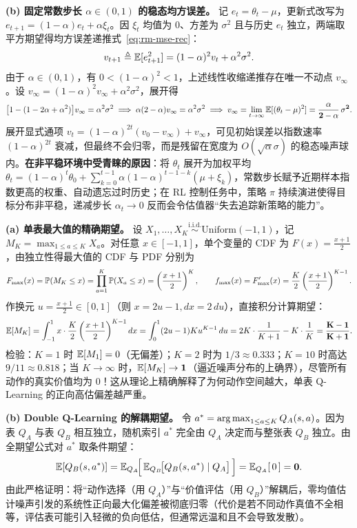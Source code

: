 \textbf{(b) 固定常数步长 $\alpha \in (0, 1)$ 的稳态均方误差。} 记 $e_t = \theta_t - \mu$，更新式改写为 $e_{t+1} = (1 - \alpha) e_t + \alpha \xi_t$。因 $\xi_t$ 均值为 $0$、方差为 $\sigma^2$ 且与历史 $e_t$ 独立，两端取平方期望得均方误差递推式~\eqref{eq:rm-mse-rec}：
\[
  v_{t+1} \triangleq \mathbb{E}[e_{t+1}^2] = (1 - \alpha)^2 v_t + \alpha^2 \sigma^2.
\]
由于 $\alpha \in (0, 1)$，有 $0 < (1 - \alpha)^2 < 1$，上述线性收缩递推存在唯一不动点 $v_\infty$。设 $v_\infty = (1 - \alpha)^2 v_\infty + \alpha^2 \sigma^2$，展开得
\[
  \big[1 - (1 - 2\alpha + \alpha^2)\big] v_\infty = \alpha^2 \sigma^2 \implies \alpha(2 - \alpha) v_\infty = \alpha^2 \sigma^2 \implies
  v_\infty = \lim_{t \to \infty} \mathbb{E}[(\theta_t - \mu)^2] = \mathbf{\frac{\alpha}{2 - \alpha}\,\sigma^2}.
\]
展开显式通项 $v_t = (1 - \alpha)^{2t}(v_0 - v_\infty) + v_\infty$，可见初始误差以指数速率 $(1-\alpha)^{2t}$ 衰减，但最终不会归零，而是残留在宽度为 $O(\sqrt{\alpha}\sigma)$ 的稳态噪声球内。\textbf{在非平稳环境中受青睐的原因}：将 $\theta_t$ 展开为加权平均 $\theta_t = (1-\alpha)^t \theta_0 + \sum_{k=0}^{t-1} \alpha(1-\alpha)^{t-1-k}(\mu + \xi_k)$，常数步长赋予近期样本指数更高的权重、自动遗忘过时历史；在 RL 控制任务中，策略 $\pi$ 持续演进使得目标分布非平稳，递减步长 $\alpha_t \to 0$ 反而会令估值器“失去追踪新策略的能力”。


\textbf{(a) 单表最大值的精确期望。} 设 $X_1, \dots, X_K \overset{\mathrm{i.i.d.}}{\sim} \mathrm{Uniform}(-1, 1)$，记 $M_K = \max_{1 \le a \le K} X_a$。对任意 $x \in [-1, 1]$，单个变量的 CDF 为 $F(x) = \frac{x + 1}{2}$，由独立性得最大值的 CDF 与 PDF 分别为
\[
  F_{\max}(x) = \mathbb{P}(M_K \le x) = \prod_{a=1}^K \mathbb{P}(X_a \le x) = \left(\frac{x + 1}{2}\right)^K, \qquad
  f_{\max}(x) = F'_{\max}(x) = \frac{K}{2}\left(\frac{x + 1}{2}\right)^{K-1}.
\]
作换元 $u = \frac{x + 1}{2} \in [0, 1]$（则 $x = 2u - 1, dx = 2\,du$），直接积分计算期望：
\[
  \mathbb{E}[M_K] = \int_{-1}^{1} x \cdot \frac{K}{2}\left(\frac{x + 1}{2}\right)^{K-1} dx
  = \int_{0}^{1} (2u - 1) K u^{K-1}\,du
  = 2K \cdot \frac{1}{K+1} - K \cdot \frac{1}{K}
  = \mathbf{\frac{K - 1}{K + 1}}.
\]
检验：$K = 1$ 时 $\mathbb{E}[M_1] = 0$（无偏差）；$K = 2$ 时为 $1/3 \approx 0.333$；$K = 10$ 时高达 $9/11 \approx 0.818$；当 $K \to \infty$ 时，$\mathbb{E}[M_K] \to \mathbf{1}$（逼近噪声分布的上确界），尽管所有动作的真实价值均为 $0$！这从理论上精确解释了为何动作空间越大，单表 Q-Learning 的正向高估偏差越严重。

\textbf{(b) Double Q-Learning 的解耦期望。} 令 $a^* = \operatorname*{arg\,max}_{1 \le a \le K} Q_A(s, a)$。因为表 $Q_A$ 与表 $Q_B$ 相互独立，随机索引 $a^*$ 完全由 $Q_A$ 决定而与整张表 $Q_B$ 独立。由全期望公式对 $a^*$ 取条件期望：
\[
  \mathbb{E}\!\left[Q_B(s, a^*)\right]
  = \mathbb{E}_{Q_A}\!\Big[\,\mathbb{E}_{Q_B}\!\big[Q_B(s, a^*) \mid Q_A\big]\,\Big]
  = \mathbb{E}_{Q_A}\!\left[\,0\,\right] = \mathbf{0}.
\]
由此严格证明：将“动作选择（用 $Q_A$）”与“价值评估（用 $Q_B$）”解耦后，零均值估计噪声引发的系统性正向最大化偏差被彻底归零（代价是若不同动作真值不全相等，评估表可能引入轻微的负向低估，但通常远温和且不会导致发散）。

